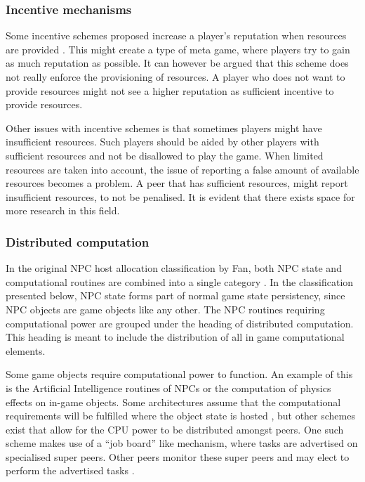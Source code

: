 \subsubsection{Incentive mechanisms}

Some incentive schemes proposed increase a player's reputation when resources are provided  \cite{classic_p2p_reputation} \cite{proactive_reputation}. This might create a type of meta game, where players try to gain as much reputation as possible. It can however be argued that this scheme does not really enforce the provisioning of resources. A player who does not want to provide resources might not see a higher reputation as sufficient incentive to provide resources.

Other issues with incentive schemes is that sometimes players might have insufficient resources. Such players should be aided by other players with sufficient resources and not be disallowed to play the game. When limited resources are taken into account, the issue of reporting a false amount of available resources becomes a problem. A peer that has sufficient resources, might report insufficient resources, to not be penalised. It is evident that there exists space for more research in this field.


\subsubsection{Distributed computation}

In the original NPC host allocation classification by Fan, both NPC state and computational routines are combined into a single category \cite{Fan_phd}. In the classification presented below, NPC state forms part of normal game state persistency, since NPC objects are game objects like any other. The NPC routines requiring computational power are grouped under the heading of distributed computation. This heading is meant to include the distribution of all in game computational elements.

Some game objects require computational power to function. An example of this is the Artificial Intelligence routines of NPCs or the computation of physics effects on in-game objects. Some architectures assume that the computational requirements will be fulfilled where the object state is hosted \cite{solipsis}, but other schemes exist that allow for the CPU power to be distributed amongst peers. One such scheme makes use of a ``job board'' like mechanism, where tasks are advertised on specialised super peers. Other peers monitor these super peers and may elect to perform the advertised tasks \cite{fan_mediator_paper}.

